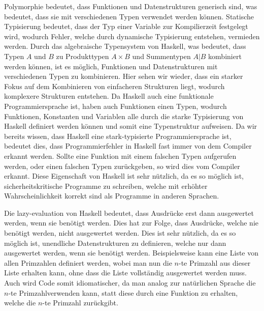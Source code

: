 \documentclass{hhuarticle}
\theoremstyle{definition}
\theoremstyle{theorem}
\begin{document}
  Polymorphie bedeutet, dass Funktionen und Datenstrukturen
  generisch sind, was bedeutet, dass sie mit verschiedenen Typen verwendet werden können.
  Statische Typisierung bedeutet, dass der Typ einer Variable
  zur Kompilierzeit festgelegt wird, wodurch Fehler, welche durch
  dynamische Typisierung entstehen, vermieden werden. Durch das
  algebraische Typensystem von Haskell, was bedeutet, dass Typen $A$ und
  $B$ zu Produkttypen $A \times B$ und Summentypen $A | B$ kombiniert werden können,
  ist es möglich, Funktionen und Datenstrukturen mit verschiedenen
  Typen zu kombinieren. Hier sehen wir wieder, dass ein starker Fokus
  auf dem Kombinieren von einfacheren Strukturen liegt, wodurch komplexere
  Strukturen entstehen. Da Haskell auch eine funktionale Programmiersprache ist,
  haben auch Funktionen einen Typen, wodurch Funktionen, Konstanten und Variablen
  alle durch die starke Typisierung von Haskell definiert werden können
  und somit eine Typenstruktur aufweisen. Da wir bereits wissen, dass
  Haskell eine stark-typisierte Programmiersprache ist, bedeutet dies,
  dass Programmierfehler in Haskell fast immer von dem Compiler erkannt werden.
  Sollte eine Funktion mit einem falschen Typen aufgerufen werden, oder
  einen falschen Typen zurückgeben, so wird dies vom Compiler erkannt.
  Diese Eigenschaft von Haskell ist sehr nützlich, da es so möglich ist,
  sicherheitskritische Programme zu schreiben, welche mit erhöhter
  Wahrscheinlichkeit korrekt sind als Programme in anderen Sprachen.

  Die lazy-evaluation von Haskell bedeutet, dass Ausdrücke erst dann
  ausgewertet werden, wenn sie benötigt werden. Dies hat zur Folge,
  dass Ausdrücke, welche nie benötigt werden, nicht ausgewertet werden.
  Dies ist sehr nützlich, da es so möglich ist, unendliche Datenstrukturen
  zu definieren, welche nur dann ausgewertet werden, wenn sie benötigt werden.
  Beispielsweise kann eine Liste von allen Primzahlen definiert werden,
  wobei man nun die $n$-te Primzahl aus dieser Liste erhalten kann,
  ohne dass die Liste vollständig ausgewertet werden muss.
  Auch wird Code somit idiomatischer, da man analog zur natürlichen
  Sprache \glqq die $n$-te Primzahl\grqq  verwenden kann, statt diese
  durch eine Funktion zu erhalten, welche die $n$-te Primzahl zurückgibt.
\end{document}
